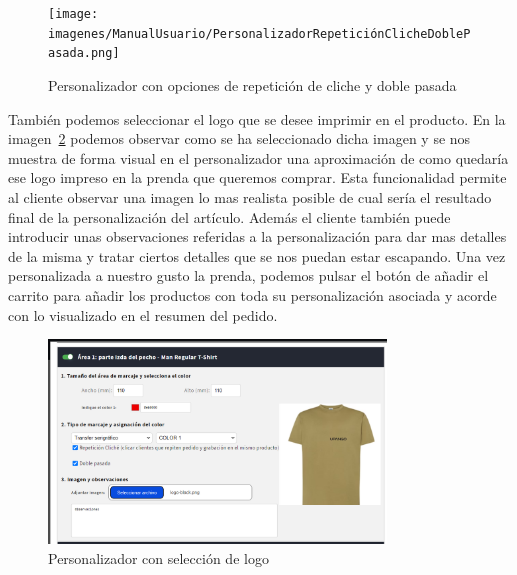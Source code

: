 \documentclass[12pt]{article}
\begin{document}
\begin{figure}[ht]
    \centering
    \texttt{[image: imagenes/ManualUsuario/PersonalizadorRepeticiónClicheDoblePasada.png]}
    \caption{\label{fig:PersonalizadorCheckboxes}Personalizador con opciones de repetición de cliche y doble pasada}
    \vspace{\fill}
\end{figure}

También podemos seleccionar el logo que se desee imprimir en el producto. En la imagen~\ref{fig:PersonalizadorLogo} podemos observar como se ha seleccionado dicha imagen y se nos muestra de forma visual en el personalizador una 
aproximación de como quedaría ese logo impreso en la prenda que queremos comprar. Esta funcionalidad permite al cliente observar una imagen lo mas realista posible de cual sería el resultado final
de la personalización del artículo. Además el cliente también puede introducir unas observaciones referidas a la personalización para dar mas detalles de la misma y tratar ciertos detalles que se nos puedan
estar escapando. Una vez personalizada a nuestro gusto la prenda, podemos pulsar el botón de añadir el carrito para añadir los productos con toda su personalización asociada y acorde con
lo visualizado en el resumen del pedido.

\begin{figure}[ht]
    \centering
    \includegraphics[width=0.8\textwidth]{imagenes/ManualUsuario/PersonalizadorLogoSeleccionado.png}
    \caption{\label{fig:PersonalizadorLogo}Personalizador con selección de logo}
    \vspace{\fill}
\end{figure}
\end{document}
